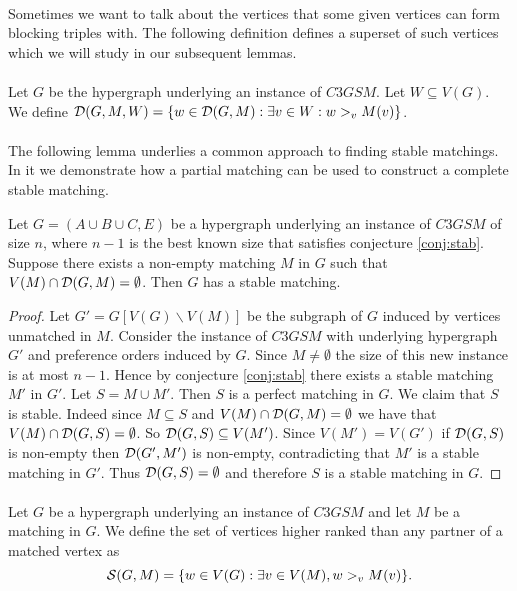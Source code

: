 \paragraph{}
Sometimes we want to talk about the vertices that some given vertices can form blocking triples with. The following definition defines a superset of such vertices which we will study in our subsequent lemmas.

\paragraph{}Let $G$ be the hypergraph underlying an instance of $C3GSM$. Let $W \subseteq V(G)$. We define $\mathcal{D}(G,M, W) = \{w \in \mathcal{D}(G,M): \exists v\in W: w>_v M(v) \}$.

\paragraph{}
The following lemma underlies a common approach to finding stable matchings. In it we demonstrate how a partial matching can be used to construct a complete stable matching.
\begin{lemma}\label{lemma:inductive}
Let $G=(A\cup B \cup C, E)$ be a hypergraph underlying an instance of $C3GSM$ of size $n$, where $n-1$ is the best known size that satisfies conjecture \ref{conj:stab}. Suppose there exists a non-empty matching $M$ in $G$ such that $V(M) \cap \mathcal{D}(G,M) = \emptyset$. Then $G$ has a stable matching.
\end{lemma}
\begin{proof}
Let $G' = G[V(G)\backslash V(M)]$ be the subgraph of $G$ induced by vertices unmatched in $M$.  Consider the instance of $C3GSM$ with underlying hypergraph $G'$ and preference orders induced by $G$. Since $M \neq \emptyset$ the size of this new instance is at most $n-1$. Hence by conjecture \ref{conj:stab} there exists a stable matching $M'$ in $G'$. Let $S = M \cup M'$. Then $S$ is a perfect matching in $G$. We claim that $S$ is stable. Indeed since $M \subseteq S$ and $V(M) \cap \mathcal{D}(G,M) = \emptyset$ we have that $V(M) \cap \mathcal{D}(G,S) = \emptyset$. So $\mathcal{D}(G,S) \subseteq V(M')$. Since $V(M') = V(G')$ if $\mathcal{D}(G,S)$ is non-empty then $\mathcal{D}(G', M')$ is non-empty, contradicting that $M'$ is a stable matching in $G'$. Thus $\mathcal{D}(G,S) = \emptyset$ and therefore $S$ is a stable matching in $G$.
\end{proof}

\paragraph{}Let $G$ be a hypergraph underlying an instance of $C3GSM$ and let $M$ be a matching in $G$. We define the set of vertices higher ranked than any partner of a matched vertex as $$\mathcal{S}(G,M) = \{w \in V(G): \exists v \in V(M), w >_v M(v)\}.$$

